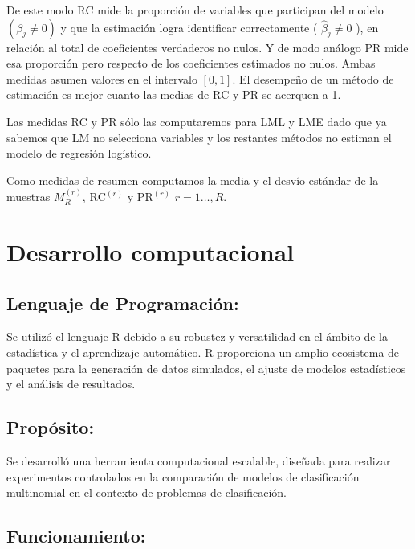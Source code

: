 \documentclass{report}
\begin{document}
De este modo $\mathrm{RC}$ mide la proporción de variables que participan del modelo $\left(\beta_j \neq 0\right)$ y que la estimación logra identificar correctamente ( $\hat{\beta}_j \neq 0$ ), en relación al total de coeficientes verdaderos no nulos.  Y de modo análogo  $\mathrm{PR}$ mide esa proporción pero respecto de los coeficientes estimados  no nulos. Ambas medidas asumen valores en el intervalo $[0,1]$.  El desempeño de un método de estimación es mejor cuanto las medias de $ \mathrm{RC}$ y $ \mathrm{PR}$ se acerquen a 1. 

Las medidas  $ \mathrm{RC}$ y $ \mathrm{PR}$  sólo las computaremos para LML y LME dado que ya sabemos que LM no selecciona variables y los restantes métodos no estiman el modelo de regresión logístico. 

Como medidas de resumen   computamos la media y el desvío estándar de la muestras  $M_R^{(r)}$, $ \mathrm{RC}^{(r)}$ y $ \mathrm{PR}^{(r)}$  $r=1\ldots, R$. 








\section{Desarrollo computacional }\label{herramientadesarrollos}
\subsection*{Lenguaje de Programación:} 

Se utilizó el lenguaje R debido a su robustez y versatilidad en el ámbito de la estadística y el aprendizaje automático. R proporciona un amplio ecosistema de paquetes para la generación de datos simulados, el ajuste de modelos estadísticos y el análisis de resultados.

\subsection*{Propósito:}

Se desarrolló una herramienta computacional escalable, diseñada para realizar experimentos controlados en la comparación de modelos de clasificación multinomial en el contexto de problemas de clasificación. 

\subsection*{Funcionamiento:}
\end{document}
